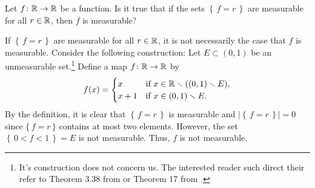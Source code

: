 \begin{problem}
  Let $f\colon\mathbb{R}\to\mathbb{R}$ be a function. Is it true that if the sets
  $\left\{\,f=r\,\right\}$ are measurable for all $r\in\mathbb{R}$, then $f$ is
  measurable?
\end{problem}
\begin{solution}
  If $\left\{\,f=r\,\right\}$ are measurable for all $r\in\mathbb{R}$, it is not
  necessarily the case that $f$ is measurable. Consider the following
  construction: Let $E\subset(0,1)$ be an unmeasurable set.\footnote{It's
    construction does not concern us. The interested reader such direct
    their refer to Theorem 3.38 from \cite[Ch.\@ 3, p.\@
    57-58]{wheeden-zygmund} or Theorem 17 from \cite[Ch.\@ 2\S 7, p.\@
    48]{royden}.} Define a map $f\colon\mathbb{R}\to\mathbb{R}$ by
  \begin{equation}
    \label{eq:prep:1:11}
    f(x)=
    \begin{cases}
      x&\text{if $x\in\mathbb{R}\smallsetminus((0,1)\smallsetminus E)$},\\
      x+1&\text{if $x\in (0,1)\smallsetminus E$.}
    \end{cases}
  \end{equation}
  By the definition, it is clear that $\left\{\,f=r\,\right\}$ is
  measurable and $\left|\left\{\,f=r\,\right\}\right|=0$ since
  $\{\,f=r\,\}$ contains at most two elements. However, the set
  $\left\{\,0<f<1\,\right\}=E$ is not measurable. Thus, $f$ is not
  measurable.
\end{solution}

